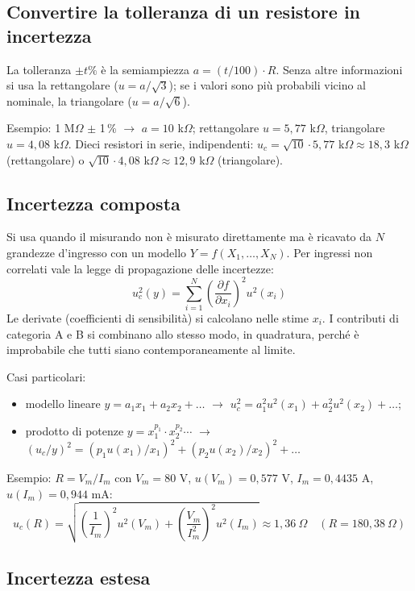 \documentclass[11pt,a4paper]{article}
\begin{document}
\subsection*{Convertire la tolleranza di un resistore in incertezza}

La tolleranza $\pm t\%$ è la semiampiezza $a = (t/100)\cdot R$. Senza altre informazioni si usa la rettangolare ($u = a/\sqrt{3}$); se i valori sono più probabili vicino al nominale, la triangolare ($u = a/\sqrt{6}$).

Esempio: 1 M$\Omega$ $\pm$ 1\,\% $\rightarrow$ $a = 10$ k$\Omega$; rettangolare $u = 5{,}77$ k$\Omega$, triangolare $u = 4{,}08$ k$\Omega$. Dieci resistori in serie, indipendenti: $u_c = \sqrt{10}\cdot5{,}77$ k$\Omega \approx 18{,}3$ k$\Omega$ (rettangolare) o $\sqrt{10}\cdot4{,}08$ k$\Omega \approx 12{,}9$ k$\Omega$ (triangolare).

\subsection*{Incertezza composta}

Si usa quando il misurando non è misurato direttamente ma è ricavato da $N$ grandezze d'ingresso con un modello $Y = f(X_1,\dots,X_N)$. Per ingressi non correlati vale la legge di propagazione delle incertezze:
\[
u_c^2(y) = \sum_{i=1}^{N} \left(\frac{\partial f}{\partial x_i}\right)^2 u^2(x_i)
\]
Le derivate (coefficienti di sensibilità) si calcolano nelle stime $x_i$. I contributi di categoria A e B si combinano allo stesso modo, in quadratura, perché è improbabile che tutti siano contemporaneamente al limite.

Casi particolari:
\begin{itemize}
\item modello lineare $y = a_1 x_1 + a_2 x_2 + \dots$ $\rightarrow$ $u_c^2 = a_1^2 u^2(x_1) + a_2^2 u^2(x_2) + \dots$;
\item prodotto di potenze $y = x_1^{p_1} \cdot x_2^{p_2} \cdots$ $\rightarrow$ $(u_c/y)^2 = (p_1 u(x_1)/x_1)^2 + (p_2 u(x_2)/x_2)^2 + \dots$
\end{itemize}

Esempio: $R = V_m/I_m$ con $V_m = 80$ V, $u(V_m) = 0{,}577$ V, $I_m = 0{,}4435$ A, $u(I_m) = 0{,}944$ mA:
\[
u_c(R) = \sqrt{\left(\frac{1}{I_m}\right)^2 u^2(V_m) + \left(\frac{V_m}{I_m^2}\right)^2 u^2(I_m)} \approx 1{,}36\ \Omega \quad (R = 180{,}38\ \Omega)
\]

\subsection*{Incertezza estesa}
\end{document}
